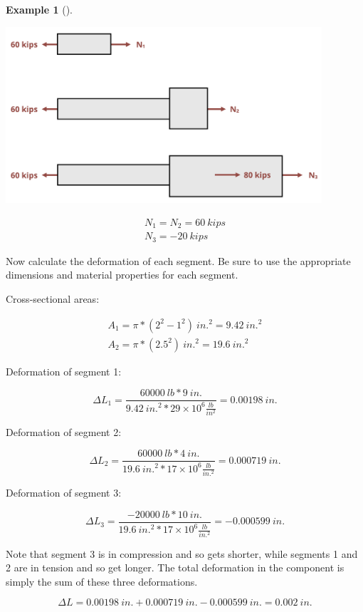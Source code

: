 \documentclass[
  letterpaper,
  DIV=11,
  numbers=noendperiod]{scrreprt}
\theoremstyle{definition}
\newtheorem{example}{Example}[chapter]
\theoremstyle{remark}
\begin{document}
\begin{tcolorbox}
\begin{example}[]
\begin{tcolorbox}
\begin{center}
\includegraphics[width=4.625in,height=\textheight]{images/PNGs/Example 5.3 part 2.png}
\end{center}

\[
\begin{gathered}
N_1=N_2=60{~kips} \\
N_3=-20{~kips}
\end{gathered}
\]

Now calculate the deformation of each segment. Be sure to use the
appropriate dimensions and material properties for each segment.

Cross-sectional areas:

\[
\begin{gathered}
A_1=\pi*(2^2-1^2){~in.}^2=9.42{~in.}^2 \\
A_2=\pi*(2.5^2){~in.}^2=19.6{~in.}^2
\end{gathered}
\]

Deformation of segment 1:

\[
\Delta L_1=\frac{60000{~lb} * 9{~in.}}{9.42{~in.}^2 * 29 \times 10^6\frac{lb}{in^2}}=0.00198{~in.}
\]

Deformation of segment 2:

\[
\Delta L_2=\frac{60000{~lb} * 4{~in.}}{19.6{~in.}^2 * 17 \times 10^6\frac{lb}{in.^2}}=0.000719{~in} .
\]

Deformation of segment 3:

\[
\Delta L_3=\frac{-20000{~lb} * 10{~in.}}{19.6{~in.}^2 * 17 \times 10^6\frac{lb}{in.^2}}=-0.000599{~in.}
\]

Note that segment 3 is in compression and so gets shorter, while
segments 1 and 2 are in tension and so get longer. The total deformation
in the component is simply the sum of these three deformations.

\[
\Delta L=0.00198{~in.}+0.000719{~in.}-0.000599{~in.}=0.002{~in.}
\]

\end{tcolorbox}

\end{example}

\end{tcolorbox}
\end{document}
